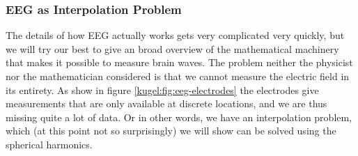 \subsubsection{EEG as Interpolation Problem}

The details of how EEG actually works gets very complicated very quickly, but we
will try our best to give an broad overview of the mathematical machinery that
makes it possible to measure brain waves. The problem neither the physicist nor
the mathematician considered is that we cannot measure the electric field in its
entirety. As show in figure \ref{kugel:fig:eeg-electrodes} the electrodes give
measurements that are only available at discrete locations, and we are thus
missing quite a lot of data. Or in other words, we have an interpolation
problem, which (at this point not so surprisingly) we will show can be solved
using the spherical harmonics.

